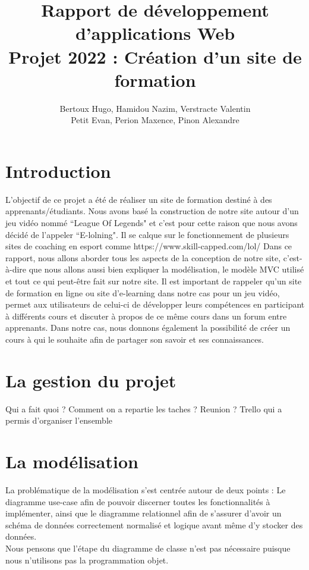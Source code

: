 \documentclass[a4paper,10pt]{article}
\title{
Rapport de développement d'applications Web\\
Projet 2022 : Création d'un site de formation
}
\author{
Bertoux Hugo, Hamidou Nazim, Verstracte Valentin\\
Petit Evan, Perion Maxence, Pinon Alexandre
}
\date{}
\begin{document}
\maketitle 
\tableofcontents

\newpage
\section{Introduction}
L'objectif de ce projet a été de réaliser un site de formation destiné à des apprenants/étudiants. Nous avons basé la construction de notre site autour d'un jeu vidéo nommé ``League Of Legends" et c'est pour cette raison que nous avons décidé de l'appeler ``E-lolning". Il se calque sur le fonctionnement de plusieurs sites de coaching en esport comme https://www.skill-capped.com/lol/ 
Dans ce rapport, nous allons aborder tous les aspects de la conception de notre site, c'est-à-dire que nous allons aussi bien expliquer la modélisation, le modèle MVC utilisé et tout ce qui peut-être fait sur notre site. Il est important de rappeler qu'un site de formation en ligne ou site d'e-learning dans notre cas pour un jeu vidéo, permet aux utilisateurs de celui-ci de développer leurs compétences en participant à différents cours et discuter à propos de ce même cours dans un forum entre apprenants. Dans notre cas, nous donnons également la possibilité de créer un cours à qui le souhaite afin de partager son savoir et ses connaissances. 

\section{La gestion du projet}
Qui a fait quoi ? Comment on a repartie les taches ? Reunion ? Trello qui a permis d'organiser l'ensemble

\section{La modélisation}
La problématique de la modélisation s'est centrée autour de deux points : Le diagramme use-case afin de pouvoir discerner toutes les fonctionnalités à implémenter, ainsi que le diagramme relationnel afin de s'assurer d'avoir un schéma de données correctement normalisé et logique avant même d'y stocker des données.\\
Nous pensons que l'étape du diagramme de classe n'est pas nécessaire puisque nous n'utilisons pas la programmation objet.
\end{document}
